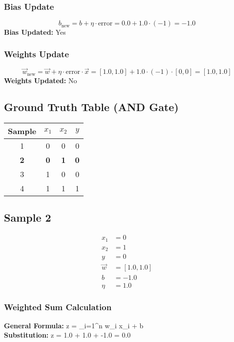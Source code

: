 \documentclass{article}
\begin{document}
\subsubsection*{Bias Update}
\[
b_{\text{new}} = b + \eta \cdot \text{error} = 0.0 + 1.0 \cdot (-1) = -1.0
\]
\textbf{Bias Updated:} Yes

\subsubsection*{Weights Update}
\[
\vec{w}_{\text{new}} = \vec{w} + \eta \cdot \text{error} \cdot \vec{x} = 
[1.0, 1.0] + 1.0 \cdot (-1) \cdot [0, 0] = 
[1.0, 1.0]
\]
\textbf{Weights Updated:} No

\subsection*{Ground Truth Table (AND Gate)}
\begin{center}
\begin{tabular}{|c|c|c|c|}
\hline
\textbf{Sample} & $x_1$ & $x_2$ & $y$ \\
\hline
1 & 0 & 0 & 0 \\
\hline
\rowcolor{yellow} \textbf{2} & \textbf{0} & \textbf{1} & \textbf{0} \\
\hline
3 & 1 & 0 & 0 \\
\hline
4 & 1 & 1 & 1 \\
\hline
\end{tabular}
\end{center}

\subsection*{Sample 2}
\begin{align*}
x_1 &= 0 \\
x_2 &= 1 \\
y &= 0 \\
\vec{w} &= [1.0, 1.0] \\
b &= -1.0 \\
\eta &= 1.0
\end{align*}

\subsubsection*{Weighted Sum Calculation}
\textbf{General Formula:} \quad
z = \sum_{i=1}^{n} w_i x_i + b
\\
\textbf{Substitution:} \quad
z = 1.0  + 1.0  + -1.0 = 0.0
\end{document}
